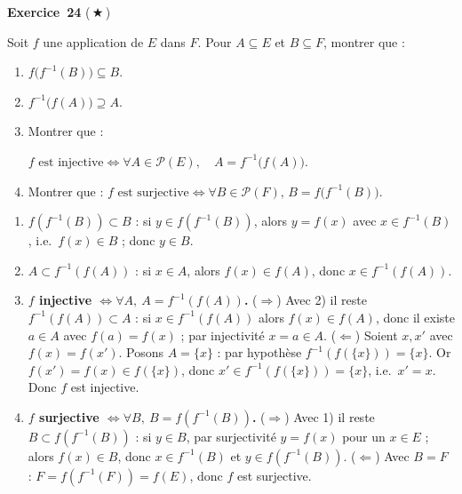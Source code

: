 \documentclass[11pt,a4paper]{article}
\begin{document}
	\medskip\noindent\textbf{\Large\color{bleu}Exercice~24} \textnormal{(\,$\bigstar$\,)}\nopagebreak
	\begin{enonce}
		Soit $f$ une application de $E$ dans $F$.
		Pour $A\subseteq E$ et $B\subseteq F$, montrer que :
		
		\begin{enumerate}
			\item
			$
			f\bigl(f^{-1}(B)\bigr)\subseteq B.
			$
			
			\item
			$
			f^{-1}\bigl(f(A)\bigr)\supseteq A.
			$
			
			\item Montrer que :
			
			$f\text{ est injective}
			\iff
			\forall A\in\mathcal{P}(E),\quad
			A=f^{-1}\bigl(f(A)\bigr).
			$
			\item Montrer que :
			$
			f\text{ est surjective}
			\iff
			\forall B\in\mathcal{P}(F),\,
			B=f\bigl(f^{-1}(B)\bigr).
			$
		\end{enumerate}
	\end{enonce}
	\begin{corrige}
		\begin{enumerate}
			\item $f(f^{-1}(B))\subset B$ : si $y\in f(f^{-1}(B))$, alors $y=f(x)$ avec $x\in f^{-1}(B)$, i.e.\ $f(x)\in B$ ; donc $y\in B$.
			\item $A\subset f^{-1}(f(A))$ : si $x\in A$, alors $f(x)\in f(A)$, donc $x\in f^{-1}(f(A))$.
			\item \textbf{$f$ injective $\iff\forall A,\ A=f^{-1}(f(A))$.} ($\Rightarrow$) Avec 2) il reste $f^{-1}(f(A))\subset A$ : si $x\in f^{-1}(f(A))$ alors $f(x)\in f(A)$, donc il existe $a\in A$ avec $f(a)=f(x)$ ; par injectivité $x=a\in A$. ($\Leftarrow$) Soient $x,x'$ avec $f(x)=f(x')$. Posons $A=\{x\}$ : par hypothèse $f^{-1}(f(\{x\}))=\{x\}$. Or $f(x')=f(x)\in f(\{x\})$, donc $x'\in f^{-1}(f(\{x\}))=\{x\}$, i.e.\ $x'=x$. Donc $f$ est injective.
			\item \textbf{$f$ surjective $\iff\forall B,\ B=f(f^{-1}(B))$.} ($\Rightarrow$) Avec 1) il reste $B\subset f(f^{-1}(B))$ : si $y\in B$, par surjectivité $y=f(x)$ pour un $x\in E$ ; alors $f(x)\in B$, donc $x\in f^{-1}(B)$ et $y\in f(f^{-1}(B))$. ($\Leftarrow$) Avec $B=F$ : $F=f(f^{-1}(F))=f(E)$, donc $f$ est surjective.
		\end{enumerate}
	\end{corrige}
	
\end{document}
